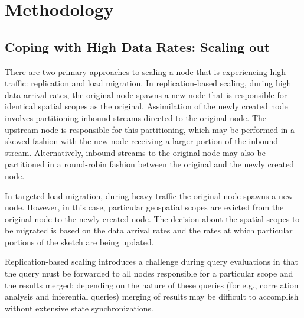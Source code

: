 
\section{Methodology}
\label{sec:methodology}




\subsection{Coping with High Data Rates: Scaling out}
\label{subsec:scaling-out}
There are two primary approaches to scaling a node that is experiencing high traffic: replication and load migration.   In replication-based scaling, during high data arrival rates, the original node spawns a new node that is responsible for identical spatial scopes as the original. Assimilation of the newly created node involves partitioning inbound streams directed to the original node. The upstream node is responsible for this partitioning, which may be performed in a skewed fashion with the new node receiving a larger portion of the inbound stream.  Alternatively, inbound streams to the original node may also be partitioned in a round-robin fashion between the original and the newly created node.

In targeted load migration, during heavy traffic the original node spawns a new node. However, in this case, particular geospatial scopes are evicted from the original node to the newly created node. The decision about the spatial scopes to be migrated is based on the data arrival rates and the rates at which particular portions of the sketch are being updated.

Replication-based scaling introduces a challenge during query evaluations in that the query must be forwarded to all nodes responsible for a particular scope and the results merged; depending on the nature of these queries (for e.g., correlation analysis and inferential queries) merging of results may be difficult to accomplish without extensive state synchronizations.

